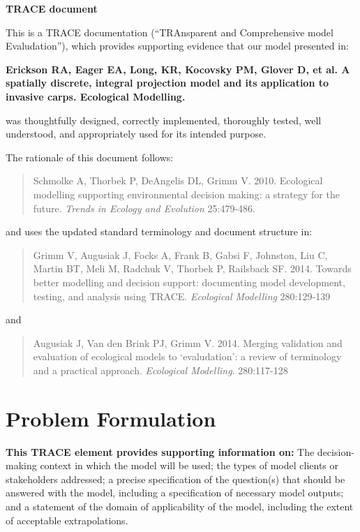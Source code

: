 \documentclass{article}[12pt]
\begin{document}
\begin{center}
\textbf{{\huge TRACE document}}
\end{center}

This is a TRACE documentation (``TRAnsparent and Comprehensive model Evaludation''), 
which provides supporting evidence that our model presented in:
\begin{center}
\textbf{Erickson RA, Eager EA, Long, KR,  Kocovsky PM, Glover D, et al. A spatially discrete, integral projection model and its application to invasive carps. Ecological Modelling.}
\end{center}
was thoughtfully designed, correctly implemented, thoroughly tested, well understood, and appropriately used for its intended purpose. 

 The rationale of this document follows: 
\begin{verse}
Schmolke A, Thorbek P, DeAngelis DL, Grimm V. 2010. Ecological modelling supporting environmental decision making: a strategy for the future. \textit{Trends in Ecology and Evolution} 25:479-486.
\end{verse}
and uses the updated standard terminology and document structure in:
\begin{verse}
Grimm V, Augusiak J, Focks A, Frank B, Gabsi F, Johnston, Liu C, Martin BT, Meli M, Radchuk V, Thorbek P, Railsback SF. 2014. Towards better modelling and decision support: documenting model development, testing, and analysis using TRACE. \textit{Ecological Modelling} 280:129-139
\end{verse}
and
\begin{verse}
Augusiak J, Van den Brink PJ, Grimm V. 2014. Merging validation and evaluation of ecological models to `evaludation': a review of terminology and a practical approach. \textit{Ecological Modelling}. 280:117-128
\end{verse}


\pagebreak

\tableofcontents

\pagebreak
\section{Problem Formulation}
\textbf{This TRACE element provides supporting information on:} The decision-making context in which the model will be used; the types of model clients or stakeholders addressed; a precise specification of the question(s) that should be answered with the model, including a specification of necessary model outputs; and a statement of the domain of applicability of the model, including the extent of acceptable extrapolations. 
\end{document}
